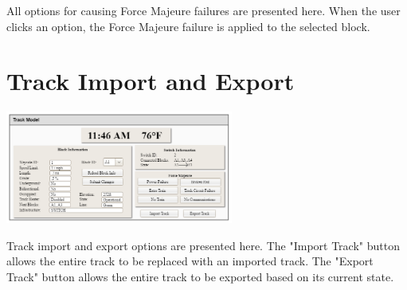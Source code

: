 \documentclass{scrreprt}
\begin{document}
All options for causing Force Majeure failures are presented here. When the user clicks
an option, the Force Majeure failure is applied to the selected block.

\section{Track Import and Export}

\begin{center}
    \includegraphics[trim={14.2cm .5cm .5cm 10.75cm},clip,width=7.5cm]{track-model}
\end{center}

Track import and export options are presented here. The "Import Track" button allows
the entire track to be replaced with an imported track. The "Export Track" button allows
the entire track to be exported based on its current state.
\end{document}
